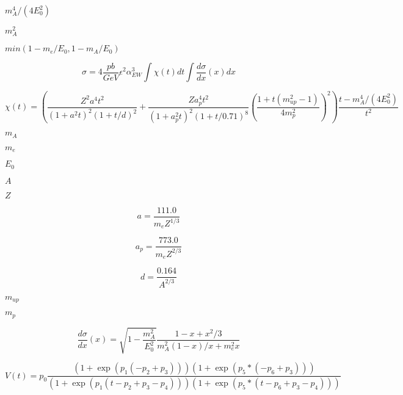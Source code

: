 \documentclass{article}
\begin{document}
$m_A^4/(4E_0^2)$
\pagebreak

$m_A^2$
\pagebreak

$min(1-m_e/E_0,1-m_A/E_0)$
\pagebreak

\[ \sigma = 4 \frac{pb}{GeV} \epsilon^2 \alpha_{EW}^3 \int \chi(t)dt \int
\frac{d\sigma}{dx}(x)dx \]
\pagebreak

\[ \chi(t) = \left(
\frac{Z^2a^4t^2}{(1+a^2t)^2(1+t/d)^2}+\frac{Za_p^4t^2}{(1+a_p^2t)^2(1+t/0.71)^8}\left(\frac{1+t(m_{up}^2-1)}{4m_p^2}\right)^2\right)\frac{t-m_A^4/(4E_0^2)}{t^2}
\]
\pagebreak

$m_A$
\pagebreak

$m_e$
\pagebreak

$E_0$
\pagebreak

$A$
\pagebreak

$Z$
\pagebreak

\[a = \frac{111.0}{m_e Z^{1/3}}\]
\pagebreak

\[a_p = \frac{773.0}{m_e Z^{2/3}}\]
\pagebreak

\[d = \frac{0.164}{A^{2/3}}\]
\pagebreak

$m_{up}$
\pagebreak

$m_{p}$
\pagebreak

\[ \frac{d\sigma}{dx}(x) =
\sqrt{1-\frac{m_A^2}{E_0^2}}\frac{1-x+x^2/3}{m_A^2(1-x)/x+m_e^2x} \]
\pagebreak

\[
 V(t) =
 p_0\frac{(1+\exp(p_1(-p_2+p_3)))(1+\exp(p_5*(-p_6+p_3)))}
         {(1+\exp(p_1(t-p_2+p_3-p_4)))(1+\exp(p_5*(t-p_6+p_3-p_4)))}
\]
\pagebreak
\end{document}
